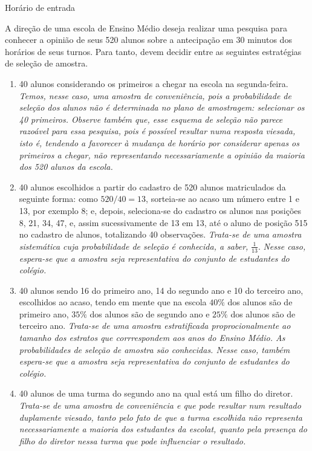 {\begin{example}{Horário de entrada}

A direção de uma escola de Ensino Médio deseja realizar uma pesquisa para conhecer a opinião de seus 520 alunos sobre a antecipação em 30 minutos dos horários de seus turnos. Para tanto, devem decidir entre as seguintes estratégias de seleção de amostra.
\begin{enumerate}
\item {} 
40 alunos considerando os primeiros a chegar na  escola na segunda-feira.  \emph{Temos, nesse caso, uma amostra de conveniência, pois a probabilidade de seleção dos alunos não é determinada no plano de amostragem: selecionar os 40 primeiros. Observe também que, esse esquema de seleção não parece razoável para essa pesquisa, pois é possível resultar numa resposta viesada, isto é, tendendo a favorecer à mudança de horário por considerar apenas os primeiros a chegar, não representando necessariamente a opinião da maioria dos 520 alunos da escola.}

\item {} 
40 alunos escolhidos a partir do cadastro de 520 alunos matriculados da seguinte forma: como \(520/40=13\), sorteia-se ao acaso um número entre 1 e 13, por exemplo 8; e, depois, seleciona-se do cadastro os alunos nas posições 8, 21, 34, 47,  e, assim sucessivamente de 13 em 13, até o aluno de posição 515 no cadastro de alunos, totalizando 40 observações. \emph{Trata-se de uma amostra sistemática cuja probabilidade de seleção é conhecida, a saber,} \(\frac{1}{13}\). \emph{Nesse caso, espera-se que a amostra seja representativa do conjunto de estudantes do colégio.}

\item {} 
40 alunos sendo 16 do primeiro ano, 14 do segundo ano e 10 do terceiro ano, escolhidos ao acaso, tendo em mente que na escola $40\%$ dos alunos são de primeiro ano, $35\%$ dos alunos são de segundo ano e $25\%$ dos alunos são de terceiro ano. \emph{Trata-se de uma amostra estratificada proprocionalmente ao tamanho dos estratos que corrrespondem aos anos do Ensino Médio. As probabilidades de seleção de amostra são conhecidas.  Nesse caso, também espera-se que a amostra seja representativa do conjunto de estudantes do colégio.}

\item {} 
40 alunos de uma turma do segundo ano na qual está um filho do diretor. \emph{Trata-se de uma amostra de conveniência e que pode resultar num resultado duplamente viesado, tanto pelo fato de que a turma escolhida não representa necessariamente a maioria dos estudantes da escolat, quanto pela presença do filho do diretor nessa turma que pode influenciar o resultado.}


\end{enumerate}
\end{example}}
